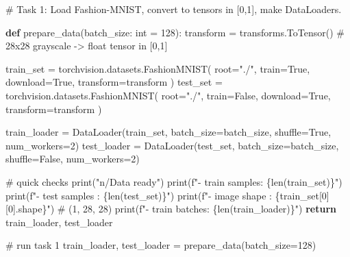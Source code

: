 \documentclass[
  letterpaper,
  DIV=11,
  numbers=noendperiod]{scrartcl}
\newenvironment{Shaded}{\begin{snugshade}}{\end{snugshade}}
\newcommand{\BuiltInTok}[1]{\textcolor[rgb]{0.00,0.23,0.31}{#1}}
\newcommand{\CommentTok}[1]{\textcolor[rgb]{0.37,0.37,0.37}{#1}}
\newcommand{\ControlFlowTok}[1]{\textcolor[rgb]{0.00,0.23,0.31}{\textbf{#1}}}
\newcommand{\DecValTok}[1]{\textcolor[rgb]{0.68,0.00,0.00}{#1}}
\newcommand{\KeywordTok}[1]{\textcolor[rgb]{0.00,0.23,0.31}{\textbf{#1}}}
\newcommand{\NormalTok}[1]{\textcolor[rgb]{0.00,0.23,0.31}{#1}}
\newcommand{\OperatorTok}[1]{\textcolor[rgb]{0.37,0.37,0.37}{#1}}
\newcommand{\SpecialCharTok}[1]{\textcolor[rgb]{0.37,0.37,0.37}{#1}}
\newcommand{\SpecialStringTok}[1]{\textcolor[rgb]{0.13,0.47,0.30}{#1}}
\newcommand{\StringTok}[1]{\textcolor[rgb]{0.13,0.47,0.30}{#1}}
\newcommand{\VariableTok}[1]{\textcolor[rgb]{0.07,0.07,0.07}{#1}}
\begin{document}
\begin{Shaded}
\begin{Highlighting}[]
\CommentTok{\# Task 1: Load Fashion{-}MNIST, convert to tensors in [0,1], make DataLoaders.}

\KeywordTok{def}\NormalTok{ prepare\_data(batch\_size: }\BuiltInTok{int} \OperatorTok{=} \DecValTok{128}\NormalTok{):}
\NormalTok{    transform }\OperatorTok{=}\NormalTok{ transforms.ToTensor()  }\CommentTok{\# 28x28 grayscale {-}\textgreater{} float tensor in [0,1]}

\NormalTok{    train\_set }\OperatorTok{=}\NormalTok{ torchvision.datasets.FashionMNIST(}
\NormalTok{        root}\OperatorTok{=}\StringTok{"./"}\NormalTok{, train}\OperatorTok{=}\VariableTok{True}\NormalTok{, download}\OperatorTok{=}\VariableTok{True}\NormalTok{, transform}\OperatorTok{=}\NormalTok{transform}
\NormalTok{    )}
\NormalTok{    test\_set }\OperatorTok{=}\NormalTok{ torchvision.datasets.FashionMNIST(}
\NormalTok{        root}\OperatorTok{=}\StringTok{"./"}\NormalTok{, train}\OperatorTok{=}\VariableTok{False}\NormalTok{, download}\OperatorTok{=}\VariableTok{True}\NormalTok{, transform}\OperatorTok{=}\NormalTok{transform}
\NormalTok{    )}

\NormalTok{    train\_loader }\OperatorTok{=}\NormalTok{ DataLoader(train\_set, batch\_size}\OperatorTok{=}\NormalTok{batch\_size, shuffle}\OperatorTok{=}\VariableTok{True}\NormalTok{, num\_workers}\OperatorTok{=}\DecValTok{2}\NormalTok{)}
\NormalTok{    test\_loader  }\OperatorTok{=}\NormalTok{ DataLoader(test\_set,  batch\_size}\OperatorTok{=}\NormalTok{batch\_size, shuffle}\OperatorTok{=}\VariableTok{False}\NormalTok{, num\_workers}\OperatorTok{=}\DecValTok{2}\NormalTok{)}

    \CommentTok{\# quick checks}
    \BuiltInTok{print}\NormalTok{(}\StringTok{"n/Data ready"}\NormalTok{)}
    \BuiltInTok{print}\NormalTok{(}\SpecialStringTok{f"{-} train samples: }\SpecialCharTok{\{}\BuiltInTok{len}\NormalTok{(train\_set)}\SpecialCharTok{\}}\SpecialStringTok{"}\NormalTok{)}
    \BuiltInTok{print}\NormalTok{(}\SpecialStringTok{f"{-} test samples : }\SpecialCharTok{\{}\BuiltInTok{len}\NormalTok{(test\_set)}\SpecialCharTok{\}}\SpecialStringTok{"}\NormalTok{)}
    \BuiltInTok{print}\NormalTok{(}\SpecialStringTok{f"{-} image shape  : }\SpecialCharTok{\{}\NormalTok{train\_set[}\DecValTok{0}\NormalTok{][}\DecValTok{0}\NormalTok{]}\SpecialCharTok{.}\NormalTok{shape}\SpecialCharTok{\}}\SpecialStringTok{"}\NormalTok{)  }\CommentTok{\# (1, 28, 28)}
    \BuiltInTok{print}\NormalTok{(}\SpecialStringTok{f"{-} train batches: }\SpecialCharTok{\{}\BuiltInTok{len}\NormalTok{(train\_loader)}\SpecialCharTok{\}}\SpecialStringTok{"}\NormalTok{)}
    \ControlFlowTok{return}\NormalTok{ train\_loader, test\_loader}

\CommentTok{\# run task 1}
\NormalTok{train\_loader, test\_loader }\OperatorTok{=}\NormalTok{ prepare\_data(batch\_size}\OperatorTok{=}\DecValTok{128}\NormalTok{)}
\end{Highlighting}
\end{Shaded}
\end{document}
